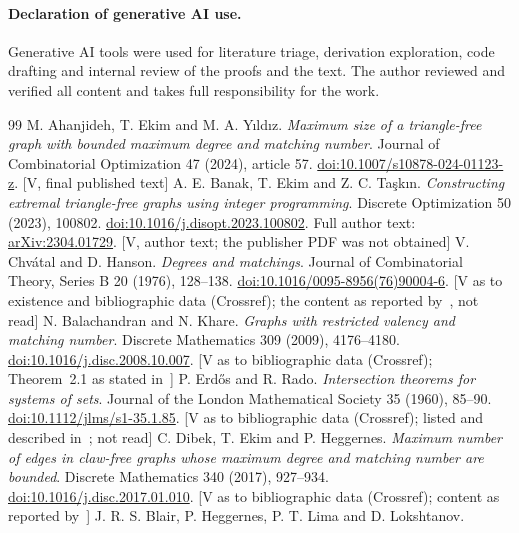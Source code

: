 \documentclass[11pt]{article}
\theoremstyle{remark}
\begin{document}
\paragraph{Declaration of generative AI use.} Generative AI tools were used for literature triage, derivation exploration, code drafting and internal review of the proofs and the text. The author reviewed and verified all content and takes full responsibility for the work.

\begin{thebibliography}{99}
 M. Ahanjideh, T. Ekim and M. A. Y\i ld\i z.
\emph{Maximum size of a triangle-free graph with bounded maximum degree and matching number}.
Journal of Combinatorial Optimization 47 (2024), article 57.
\href{https://doi.org/10.1007/s10878-024-01123-z}{doi:10.1007/s10878-024-01123-z}. [V, final published text]
 A. E. Banak, T. Ekim and Z. C. Ta\c{s}k\i n.
\emph{Constructing extremal triangle-free graphs using integer programming}.
Discrete Optimization 50 (2023), 100802.
\href{https://doi.org/10.1016/j.disopt.2023.100802}{doi:10.1016/j.disopt.2023.100802}.
Full author text: \href{https://arxiv.org/abs/2304.01729}{arXiv:2304.01729}. [V, author text; the publisher PDF was not obtained]
 V. Chv\'atal and D. Hanson.
\emph{Degrees and matchings}.
Journal of Combinatorial Theory, Series B 20 (1976), 128--138.
\href{https://doi.org/10.1016/0095-8956(76)90004-6}{doi:10.1016/0095-8956(76)90004-6}. [V as to existence and bibliographic data (Crossref); the content as reported by~\cite{AEY,BET}, not read]
 N. Balachandran and N. Khare.
\emph{Graphs with restricted valency and matching number}.
Discrete Mathematics 309 (2009), 4176--4180.
\href{https://doi.org/10.1016/j.disc.2008.10.007}{doi:10.1016/j.disc.2008.10.007}. [V as to bibliographic data (Crossref); Theorem~2.1 as stated in~\cite{AEY}]
 P. Erd\H{o}s and R. Rado.
\emph{Intersection theorems for systems of sets}.
Journal of the London Mathematical Society 35 (1960), 85--90.
\href{https://doi.org/10.1112/jlms/s1-35.1.85}{doi:10.1112/jlms/s1-35.1.85}. [V as to bibliographic data (Crossref); listed and described in~\cite{BET}; not read]
 C. Dibek, T. Ekim and P. Heggernes.
\emph{Maximum number of edges in claw-free graphs whose maximum degree and matching number are bounded}.
Discrete Mathematics 340 (2017), 927--934.
\href{https://doi.org/10.1016/j.disc.2017.01.010}{doi:10.1016/j.disc.2017.01.010}. [V as to bibliographic data (Crossref); content as reported by~\cite{AEY}]
 J. R. S. Blair, P. Heggernes, P. T. Lima and D. Lokshtanov.

\end{thebibliography}
\end{document}
